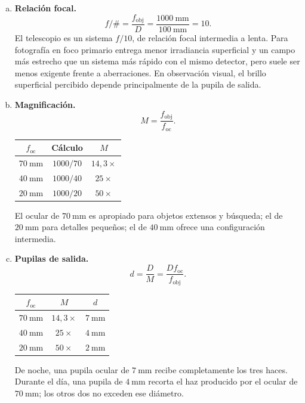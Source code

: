 \begin{enumerate}[a)]
    \item \textbf{Relación focal.}
    \[
        f/\#=\frac{f_{\text{obj}}}{D}
        =\frac{1000~\text{mm}}{100~\text{mm}}=10.
    \]
    El telescopio es un sistema $f/10$, de relación focal intermedia a lenta.
    Para fotografía en foco primario entrega menor irradiancia superficial y un
    campo más estrecho que un sistema más rápido con el mismo detector, pero
    suele ser menos exigente frente a aberraciones. En observación visual, el
    brillo superficial percibido depende principalmente de la pupila de salida.

    \item \textbf{Magnificación.}
    \[
        M=\frac{f_{\text{obj}}}{f_{\text{oc}}}.
    \]
    \begin{center}
    \begin{tabular}{ccc}
        \toprule
        $f_{\text{oc}}$ & Cálculo & $M$ \\
        \midrule
        $70~\text{mm}$ & $1000/70$ & $14{,}3\times$ \\
        $40~\text{mm}$ & $1000/40$ & $25\times$ \\
        $20~\text{mm}$ & $1000/20$ & $50\times$ \\
        \bottomrule
    \end{tabular}
    \end{center}
    El ocular de $70~\text{mm}$ es apropiado para objetos extensos y búsqueda;
    el de $20~\text{mm}$ para detalles pequeños; el de $40~\text{mm}$ ofrece
    una configuración intermedia.

    \item \textbf{Pupilas de salida.}
    \[
        d=\frac{D}{M}=\frac{D f_{\text{oc}}}{f_{\text{obj}}}.
    \]
    \begin{center}
    \begin{tabular}{ccc}
        \toprule
        $f_{\text{oc}}$ & $M$ & $d$ \\
        \midrule
        $70~\text{mm}$ & $14{,}3\times$ & $7~\text{mm}$ \\
        $40~\text{mm}$ & $25\times$ & $4~\text{mm}$ \\
        $20~\text{mm}$ & $50\times$ & $2~\text{mm}$ \\
        \bottomrule
    \end{tabular}
    \end{center}
    De noche, una pupila ocular de $7~\text{mm}$ recibe completamente los tres
    haces. Durante el día, una pupila de $4~\text{mm}$ recorta el haz producido
    por el ocular de $70~\text{mm}$; los otros dos no exceden ese diámetro.


\end{enumerate}
